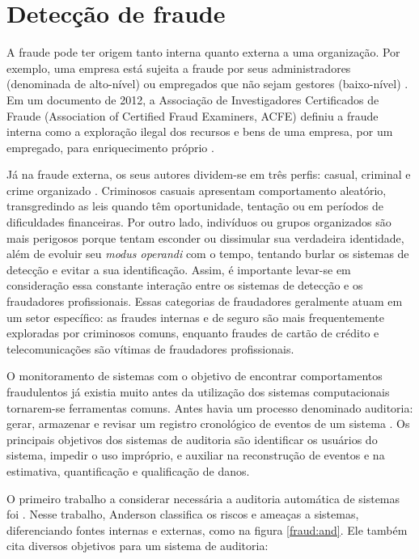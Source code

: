 \chapter{Detecção de fraude}

A fraude pode ter origem tanto interna quanto externa a uma organização. Por exemplo, uma empresa está sujeita a fraude por seus administradores (denominada de alto-nível) ou empregados que não sejam gestores (baixo-nível) \cite{Phua2010}. Em um documento de 2012, a Associação de Investigadores Certificados de Fraude (Association of Certified Fraud Examiners, ACFE) definiu a fraude interna como a exploração ilegal dos recursos e bens de uma empresa, por um empregado, para enriquecimento próprio \cite{ACFE2012}.

Já na fraude externa, os seus autores dividem-se em três perfis: casual, criminal e crime organizado \cite{Phua2010}. Criminosos casuais apresentam comportamento aleatório, transgredindo as leis quando têm oportunidade, tentação ou em períodos de dificuldades financeiras. Por outro lado, indivíduos ou grupos organizados são mais perigosos porque tentam esconder ou dissimular sua verdadeira identidade, além de evoluir seu \emph{modus operandi} com o tempo, tentando burlar os sistemas de detecção e evitar a sua identificação. Assim, é importante levar-se em consideração essa constante interação entre os sistemas de detecção e os fraudadores profissionais. Essas categorias de fraudadores geralmente atuam em um setor específico: as fraudes internas e de seguro são mais frequentemente exploradas por criminosos comuns, enquanto fraudes de cartão de crédito e telecomunicações são vítimas de fraudadores profissionais.

O monitoramento de sistemas com o objetivo de encontrar comportamentos fraudulentos já existia muito antes da utilização dos sistemas computacionais tornarem-se ferramentas comuns. Antes havia um processo denominado auditoria: gerar, armazenar e revisar um registro cronológico de eventos de um sistema \cite{Bace2000}. Os principais objetivos dos sistemas de auditoria são identificar os usuários do sistema, impedir o uso impróprio, e auxiliar na reconstrução de eventos e na estimativa, quantificação e qualificação de danos.

O primeiro trabalho a considerar necessária a auditoria automática de sistemas foi \citet{Anderson1972}. Nesse trabalho, Anderson classifica os riscos e ameaças a sistemas, diferenciando fontes internas e externas, como na figura \ref{fraud:and}. Ele também cita diversos objetivos para um sistema de auditoria:

